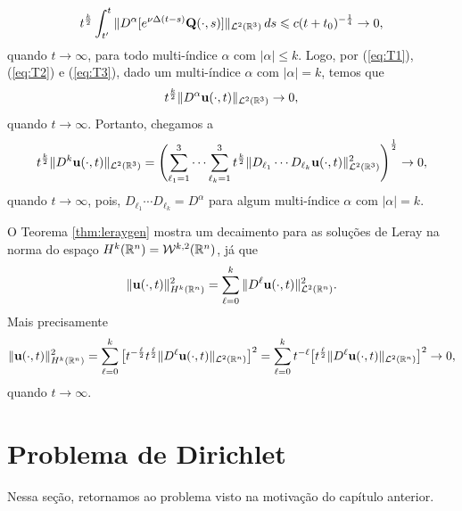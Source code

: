 \begin{prf}
    \begin{equation} \label{eq:T3}
        \begin{aligned}
            t^{\frac{k}{2}} \int_{t'}^t \Vert D^\alpha[e^{\nu\Delta(t-s)}\mathbf{Q}(\cdot,s)] \Vert_{\mathcal{L}^2(\mathbb{R}^3)} \,ds \leqslant c (t + t_0)^{-\frac{1}{4}} \to 0, \\
        \end{aligned}
    \end{equation}
    quando $t \to \infty$, para todo multi-índice $\alpha$ com $|\alpha| \leqslant k$. Logo, por (\ref{eq:T1}), (\ref{eq:T2}) e (\ref{eq:T3}), dado um multi-índice $\alpha$ com $|\alpha| = k$, temos que
    \[
        t^{\frac{k}{2}} \Vert D^\alpha \mathbf{u}(\cdot,t) \Vert_{\mathcal{L}^2(\mathbb{R}^3)} \to 0,
    \]
    quando $t \to \infty$.
    Portanto, chegamos a
    \[
        t^{\frac{k}{2}} \Vert D^k \mathbf{u}(\cdot,t) \Vert_{\mathcal{L}^2(\mathbb{R}^3)} = \left( \sum_{\ell_1=1}^{3} \cdots \sum_{\ell_k=1}^3 t^{\frac{k}{2}} \Vert D_{\ell_1} \cdots D_{\ell_k} \mathbf{u}(\cdot,t) \Vert_{\mathcal{L}^2(\mathbb{R}^3)}^2 \right)^{\frac{1}{2}} \to 0,
    \]
    quando $t \to \infty$, pois, $D_{\ell_1} \cdots D_{\ell_k} = D^\alpha$ para algum multi-índice $\alpha$ com $|\alpha| = k$.
\end{prf}

O Teorema \ref{thm:leraygen} mostra um decaimento para as soluções de Leray na norma do espaço $H^k(\mathbb{R}^n) = \mathcal{W}^{k,2}(\mathbb{R}^n)$, já que
\[
    \Vert \mathbf{u}(\cdot,t) \Vert_{H^k(\mathbb{R}^n)}^2 = \sum_{\ell = 0}^k \Vert D^\ell\mathbf{u}(\cdot,t) \Vert_{\mathcal{L}^2(\mathbb{R}^n)}^2.
\]
Mais precisamente
\[
    \Vert \mathbf{u}(\cdot,t) \Vert_{H^k(\mathbb{R}^n)}^2 = \sum_{\ell = 0}^k \big[ t^{-\frac{\ell}{2}} t^{\frac{\ell}{2}} \Vert D^\ell \mathbf{u}(\cdot,t) \Vert_{\mathcal{L}^2(\mathbb{R}^n)} \big]^2 = \sum_{\ell = 0}^k t^{-\ell} \big[ t^{\frac{\ell}{2}} \Vert D^\ell \mathbf{u}(\cdot,t) \Vert_{\mathcal{L}^2(\mathbb{R}^n)} \big]^2 \to 0,
\]
quando $t \to \infty$.

\section{Problema de Dirichlet} \label{sec:dirichlet}

Nessa seção, retornamos ao problema visto na motivação do capítulo anterior.


